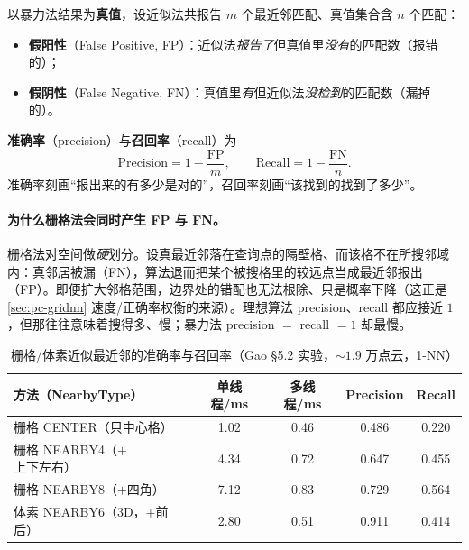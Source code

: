\begin{definition}\label{def:pc-nn-eval}
以暴力法结果为\textbf{真值}，设近似法共报告 $m$ 个最近邻匹配、真值集合含 $n$ 个匹配：
\begin{itemize}
  \item \textbf{假阳性}（False Positive, FP）：近似法\emph{报告了}但真值里\emph{没有}的匹配数（报错的）；
  \item \textbf{假阴性}（False Negative, FN）：真值里\emph{有}但近似法\emph{没检到}的匹配数（漏掉的）。
\end{itemize}
\textbf{准确率}（precision）与\textbf{召回率}（recall）为
\begin{equation}
  \mathrm{Precision}=1-\frac{\mathrm{FP}}{m},\qquad
  \mathrm{Recall}=1-\frac{\mathrm{FN}}{n}.
  \label{eq:pc-precision-recall}
\end{equation}
准确率刻画“报出来的有多少是对的”，召回率刻画“该找到的找到了多少”。
\end{definition}

\paragraph{为什么栅格法会同时产生 FP 与 FN。}
栅格法对空间做\emph{硬}划分。设真最近邻落在查询点的隔壁格、而该格不在所搜邻域内：真邻居被漏（FN），算法退而把某个被搜格里的较远点当成最近邻报出（FP）。即便扩大邻格范围，边界处的错配也无法根除、只是概率下降（这正是 \cref{sec:pc-gridnn} 速度/正确率权衡的来源）。理想算法 precision、recall 都应接近 $1$，但那往往意味着搜得多、慢；暴力法 precision $=$ recall $=1$ 却最慢。

\begin{table}[H]\centering\small
\caption{栅格/体素近似最近邻的准确率与召回率（Gao §5.2 实验，$\sim1.9$ 万点云，1-NN）}
\label{tab:pc-grideval}
\begin{tabular}{lcccc}
\toprule
方法（NearbyType） & 单线程/ms & 多线程/ms & Precision & Recall \\
\midrule
栅格 CENTER（只中心格） & 1.02 & 0.46 & 0.486 & 0.220 \\
栅格 NEARBY4（$+$上下左右） & 4.34 & 0.72 & 0.647 & 0.455 \\
栅格 NEARBY8（$+$四角） & 7.12 & 0.83 & 0.729 & 0.564 \\
体素 NEARBY6（3D，$+$前后） & 2.80 & 0.51 & 0.911 & 0.414 \\
\bottomrule
\end{tabular}
\end{table}

